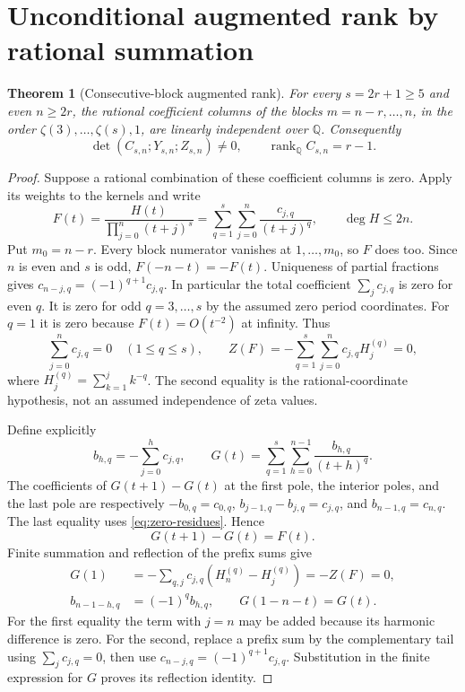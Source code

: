 \documentclass[11pt]{article}
\newtheorem{theorem}{Theorem}[section]
\theoremstyle{remark}
\newcommand{\Q}{\mathbb Q}
\begin{document}
\section{Unconditional augmented rank by rational summation}
\begin{theorem}[Consecutive-block augmented rank]
\label{thm:rank}
For every \(s=2r+1\ge5\) and even \(n\ge2r\), the rational coefficient
columns of the blocks \(m=n-r,\ldots,n\), in the order
\(\zeta(3),\ldots,\zeta(s),1\), are linearly independent over \(\Q\).
Consequently
\[
 \det(C_{s,n};Y_{s,n};Z_{s,n})\ne0,\qquad
 \operatorname{rank}_{\Q}C_{s,n}=r-1.
\]
\end{theorem}
\begin{proof}
Suppose a rational combination of these coefficient columns is zero.
Apply its weights to the kernels and write
\[
 F(t)=\frac{H(t)}{\prod_{j=0}^n(t+j)^s}
     =\sum_{q=1}^s\sum_{j=0}^n\frac{c_{j,q}}{(t+j)^q},
 \qquad \deg H\le2n.
\]
Put \(m_0=n-r\). Every block numerator vanishes at
\(1,\ldots,m_0\), so \(F\) does too. Since \(n\) is even and \(s\)
is odd, \(F(-n-t)=-F(t)\). Uniqueness of partial fractions gives
\(c_{n-j,q}=(-1)^{q+1}c_{j,q}\). In particular the total coefficient
\(\sum_jc_{j,q}\) is zero for even \(q\). It is zero for odd
\(q=3,\ldots,s\) by the assumed zero period coordinates. For \(q=1\)
it is zero because \(F(t)=O(t^{-2})\) at infinity. Thus
\begin{equation}
 \sum_{j=0}^n c_{j,q}=0\quad(1\le q\le s),\qquad
 Z(F)=-\sum_{q=1}^s\sum_{j=0}^n c_{j,q}H_j^{(q)}=0,
 \label{eq:zero-residues}
\end{equation}
where \(H_j^{(q)}=\sum_{k=1}^j k^{-q}\). The second equality is the
rational-coordinate hypothesis, not an assumed independence of zeta values.

Define explicitly
\[
 b_{h,q}=-\sum_{j=0}^h c_{j,q},\qquad
 G(t)=\sum_{q=1}^s\sum_{h=0}^{n-1}\frac{b_{h,q}}{(t+h)^q}.
\]
The coefficients of \(G(t+1)-G(t)\) at the first pole, the interior
poles, and the last pole are respectively
\(-b_{0,q}=c_{0,q}\),
\(b_{j-1,q}-b_{j,q}=c_{j,q}\), and
\(b_{n-1,q}=c_{n,q}\). The last equality uses
\eqref{eq:zero-residues}. Hence
\begin{equation}
 G(t+1)-G(t)=F(t).
 \label{eq:antidifference}
\end{equation}
Finite summation and reflection of the prefix sums give
\begin{align}
 G(1)&=-\sum_{q,j}c_{j,q}(H_n^{(q)}-H_j^{(q)})=-Z(F)=0,
 \label{eq:rank-boundary}\\
 b_{n-1-h,q}&=(-1)^q b_{h,q},\qquad G(1-n-t)=G(t).
 \label{eq:rank-reflection}
\end{align}
For the first equality the term with \(j=n\) may be added because its
harmonic difference is zero. For the second, replace a prefix sum by
the complementary tail using \(\sum_jc_{j,q}=0\), then use
\(c_{n-j,q}=(-1)^{q+1}c_{j,q}\). Substitution in the finite expression
for \(G\) proves its reflection identity.


\end{proof}
\end{document}
